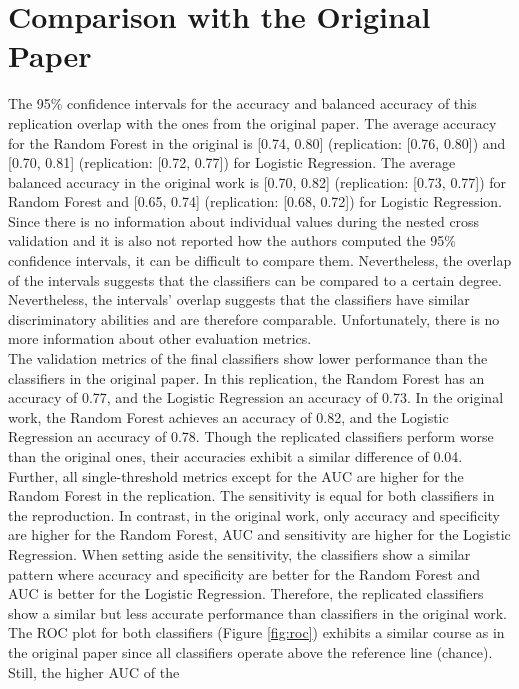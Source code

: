 \section{Comparison with the Original Paper}
The 95\% confidence intervals for the accuracy and balanced accuracy of this 
replication overlap with the ones from the original paper. The average accuracy 
for the Random Forest in the original is [0.74, 0.80] (replication: [0.76, 
0.80]) 
and [0.70, 0.81] (replication: [0.72, 0.77]) for Logistic Regression. The 
average balanced accuracy in the original work is [0.70, 0.82] (replication: 
[0.73, 0.77]) for Random Forest and [0.65, 0.74] (replication: [0.68, 0.72]) 
for Logistic Regression. Since there is no information about individual values 
during the nested cross validation and it is also not reported how the authors 
computed the 95\% confidence intervals, it can be difficult to compare them. 
Nevertheless, the overlap of the intervals suggests that the classifiers can be 
compared to a certain degree. Nevertheless, the intervals' overlap suggests that 
the classifiers have similar discriminatory abilities and are therefore 
comparable. Unfortunately, there is no more information about other evaluation 
metrics.
\\
The validation metrics of the final classifiers show lower performance than the 
classifiers in the original paper. In this replication, the Random Forest has an 
accuracy of 0.77, and the Logistic Regression an accuracy of 0.73. In the 
original work, the Random Forest achieves an accuracy of 0.82, and the Logistic 
Regression an accuracy of 0.78. Though the replicated classifiers perform worse 
than the original ones, their accuracies exhibit a similar difference of 0.04. 
Further, all single-threshold metrics except for the AUC are higher for the 
Random Forest in the replication. The sensitivity is equal for both classifiers 
in the reproduction.  In contrast, in the original work, only accuracy and 
specificity are higher for the Random Forest, AUC and sensitivity are higher for 
the Logistic Regression. When setting aside the sensitivity, the classifiers 
show a similar pattern where accuracy and specificity are better for the Random 
Forest and AUC is better for the Logistic Regression. Therefore, the replicated 
classifiers show a similar but less accurate performance than classifiers in the 
original work. The ROC plot for both classifiers (Figure \ref{fig:roc}) 
exhibits a similar course as in the original paper since all classifiers 
operate above the reference line (chance). Still, the higher AUC of the 
